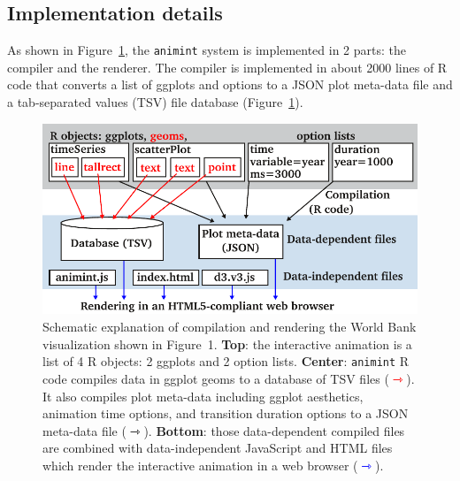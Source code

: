 \documentclass[journal]{vgtc}\usepackage[]{graphicx}\usepackage[]{color}
\begin{document}
\subsection{Implementation details}
\label{sec:implementation}

As shown in Figure~\ref{fig:design}, the \texttt{animint} system is implemented
in 2 parts: the compiler and the renderer. The compiler is implemented in about 
2000 lines of R code that converts a list of ggplots and options to a JSON 
plot meta-data file and a tab-separated values (TSV) file database
(Figure~\ref{fig:design}).

\begin{figure}[htp]
  \centering
  \includegraphics[width=\columnwidth]{figure-design}
  \caption{Schematic explanation of compilation and rendering the
    World Bank visualization shown in Figure~1. \textbf{Top}: the
    interactive animation is a list of 4 R objects: 2 ggplots and 2
    option lists. \textbf{Center}: \texttt{animint} R code compiles data in
    ggplot geoms to a database of TSV files
    (\textcolor{red}{$\rightarrowtriangle$}). It also compiles plot
    meta-data including ggplot aesthetics, animation time
    options, and transition duration options to a JSON meta-data file
    ($\rightarrowtriangle$). \textbf{Bottom}: those data-dependent
    compiled files are combined with data-independent JavaScript and
    HTML files which render the interactive animation in a web browser
    (\textcolor{blue}{$\rightarrowtriangle$}).}
  \label{fig:design}
\end{figure}
\end{document}
